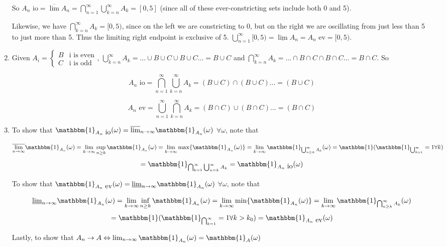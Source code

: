 \documentclass[12pt]{article}
\begin{document}
\begin{enumerate}
So $A_n \mbox{ io}=\overline{\lim} A_n = \bigcap^\infty_{n=1} \bigcup_{k=n}^\infty A_k = [0,5]$ (since all of these ever-constricting sets include both 0 and 5).

Likewise, we have $\bigcap^\infty_{k=n} A_k = [0,5)$, since on the left we are constricting to 0, but on the right we are oscillating from just less than 5 to just more than 5. Thus the limiting right endpoint is exclusive of 5. $\bigcup^\infty_{n=1}[0,5)=\underline{\lim} A_n= A_n \mbox{ ev}=[0,5)$.

\item Given $A_i= \begin{cases} B & \mbox{i is even} \\ C & \mbox{i is odd} \end{cases}$, $\bigcup^\infty_{k=n} A_k = \dots \cup B \cup C \cup B \cup C \dots = B \cup C$ and $\bigcap^\infty_{k=n} A_k = \dots \cap B \cap C \cap B \cap C \dots = B \cap C$. So 

$$ A_n \mbox{ io}=\bigcap^\infty_{n=1}\bigcup^\infty_{k=n} A_k = (B \cup C) \cap (B \cup C)\dots = (B \cup C)$$

$$ A_n \mbox{ ev}=\bigcup^\infty_{n=1}\bigcap^\infty_{k=n} A_k = (B \cap C) \cup (B \cap C)\dots = (B \cap C)$$

\item To show that $\mathbbm{1}_{A_n\mbox{ io}}(\omega)=\overline{\lim}_{n\to\infty}\mathbbm{1}_{A_n}(\omega)$ $\forall \omega$, note that 

$$\overline{\lim_{n\to\infty}}\mathbbm{1}_{A_n}(\omega)=\lim_{k \to \infty} \sup_{n \geq k} \mathbbm{1}_{A_n}(\omega)=\lim_{k \to \infty} \max \{\mathbbm{1}_{A_n}(\omega)\}=\lim_{k \to \infty} \mathbbm{1}_{\bigcup^\infty_{n \geq k} A_k}(\omega)=\mathbbm{1}(\mathbbm{1}_{\bigcup^\infty_{k=1}}=1\forall k)$$ $$=\mathbbm{1}_{ \bigcap^\infty_{k=1} \bigcup^\infty_{n=k}A_k} = \mathbbm{1}_{A_n\mbox{ io}}(\omega) $$

To show that $\mathbbm{1}_{A_n\mbox{ ev}}(\omega)=\underline{\lim}_{n\to\infty}\mathbbm{1}_{A_n}(\omega)$ $\forall \omega$, note that 

$$\underline{\lim}_{n\to\infty}\mathbbm{1}_{A_n}(\omega)=\lim_{k \to \infty} \inf_{n \geq k} \mathbbm{1}_{A_n}(\omega)=\lim_{k \to \infty} \min \{\mathbbm{1}_{A_n}(\omega)\}=\lim_{k \to \infty} \mathbbm{1}_{\bigcap^\infty_{n \geq k} A_k}(\omega)$$ $$=\mathbbm{1}(\mathbbm{1}_{\bigcap^\infty_{k=1}}=1\forall k>k_0) = \mathbbm{1}_{A_n\mbox{ ev}}(\omega) $$

Lastly, to show that $A_n \to A \Leftrightarrow \lim_{n \to \infty} \mathbbm{1}_{A_n}(\omega)=\mathbbm{1}_{A}(\omega)$


\end{enumerate}
\end{document}
